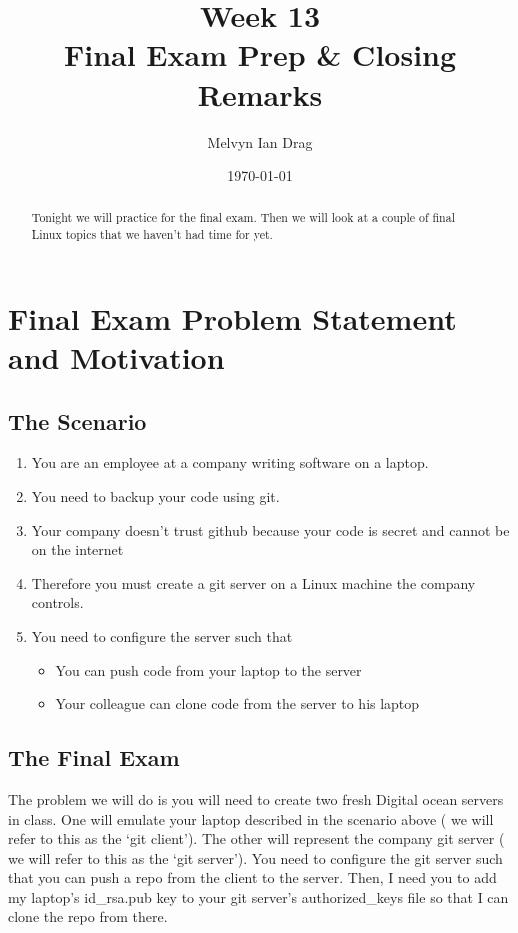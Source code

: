 \documentclass[10pt]{article}
\title{\textbf{Week 13} \\
\Large Final Exam Prep \& Closing Remarks}
\author{ Melvyn Ian Drag }
\date{\today}
\begin{document}
\maketitle

\begin{abstract}
Tonight we will practice for the final exam. Then we will look at a couple of
final Linux topics that we haven't had time for yet.
\end{abstract}

\section{Final Exam Problem Statement and Motivation} 
\subsection{The Scenario}
\begin{enumerate}
\item You are an employee at a company writing software on a laptop.
\item You need to backup your code using git.
\item Your company doesn't trust github because your code is secret and cannot
be on the internet
\item Therefore you must create a git server on a Linux machine the company
controls.
\item You need to configure the server such that 
\begin{itemize}
\item You can push code from your laptop to the server
\item Your colleague can clone code from the server to his laptop
\end{itemize}
\end{enumerate}

\subsection{The Final Exam}
The problem we will do is you will need to create two fresh Digital ocean
servers in class. One will emulate your laptop described in the scenario above (
we will refer to this as the `git client').
The other will represent the company git server ( we will refer to this as the
`git server'). You need to configure the git server such that you can push a
repo from the client to the server. Then, I need you to add my laptop's
id\_rsa.pub key to your git server's authorized\_keys file so that I can clone
the repo from there.
\end{document}
